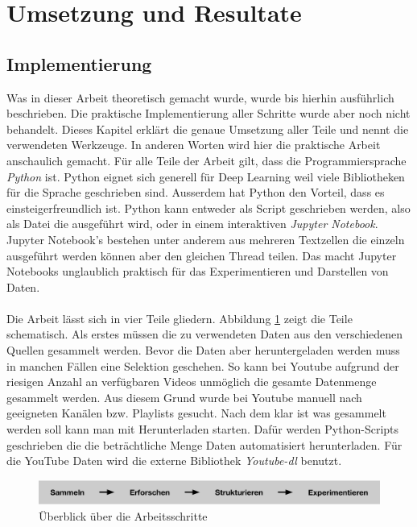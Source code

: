 \section{Umsetzung und Resultate}

\subsection{Implementierung}

Was in dieser Arbeit theoretisch gemacht wurde, wurde bis hierhin ausführlich beschrieben. Die praktische Implementierung aller Schritte wurde aber noch nicht behandelt. Dieses Kapitel erklärt die genaue Umsetzung aller Teile und nennt die verwendeten Werkzeuge. In anderen Worten wird hier die praktische Arbeit anschaulich gemacht.
Für alle Teile der Arbeit gilt, dass die Programmiersprache \textit{Python} ist. Python eignet sich generell für Deep Learning weil viele Bibliotheken für die Sprache geschrieben sind. Ausserdem hat Python den Vorteil, dass es einsteigerfreundlich ist. Python kann entweder als Script geschrieben werden, also als Datei die ausgeführt wird, oder in einem interaktiven \textit{Jupyter Notebook}\parencite{jupyter}. Jupyter Notebook's  bestehen unter anderem aus mehreren Textzellen die einzeln ausgeführt werden können aber den gleichen Thread teilen. Das macht Jupyter Notebooks unglaublich praktisch für das Experimentieren und Darstellen von Daten.
\\ \\
Die Arbeit lässt sich in vier Teile gliedern. Abbildung \ref{img:vorgehen} zeigt die Teile schematisch. 
Als erstes müssen die zu verwendeten Daten aus den verschiedenen Quellen gesammelt werden. Bevor die Daten aber heruntergeladen werden muss in manchen Fällen eine Selektion geschehen. So kann bei Youtube aufgrund der riesigen Anzahl an verfügbaren Videos unmöglich die gesamte Datenmenge gesammelt werden. Aus diesem Grund wurde bei Youtube manuell nach geeigneten Kanälen bzw. Playlists gesucht. Nach dem klar ist was gesammelt werden soll kann man mit Herunterladen starten. Dafür werden Python-Scripts geschrieben die die beträchtliche Menge Daten automatisiert herunterladen. Für die YouTube Daten wird die externe Bibliothek \textit{Youtube-dl}\parencite{youtube-dl} benutzt.

 \begin{figure}[hbt]
	\centering
		\includegraphics[width=1.0\textwidth]{assets/vorgang_small.png}
	\caption{Überblick über die Arbeitsschritte}
	\label{img:vorgehen}
\end{figure}

